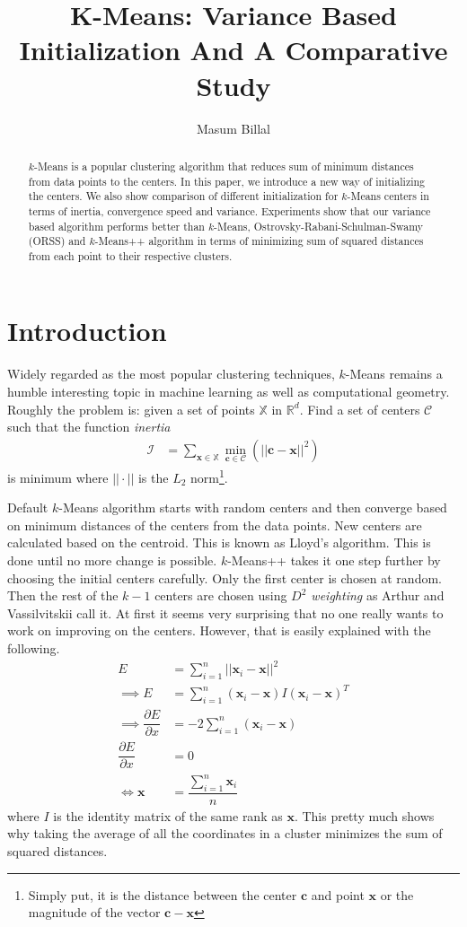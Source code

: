 \documentclass[10pt, leqno]{article}
\author{Masum Billal}
\title{K-Means: Variance Based Initialization And A Comparative Study}
\newcommand{\x}{\mathbf{x}}
\begin{document}
	\maketitle
		\begin{abstract}
			$k$-Means is a popular clustering algorithm that reduces sum of minimum distances from data points to the centers. In this paper, we introduce a new way of initializing the centers. We also show comparison of different initialization for $k$-Means centers in terms of inertia, convergence speed and variance. Experiments show that our variance based algorithm performs better than $k$-Means, Ostrovsky-Rabani-Schulman-Swamy (ORSS) and $k$-Means++ algorithm in terms of minimizing sum of squared distances from each point to their respective clusters.
		\end{abstract}
	\section{Introduction}
	Widely regarded as the most popular clustering techniques, $k$-Means remains a humble interesting topic in machine learning as well as computational geometry. Roughly the problem is: given a set of points $\mathbb{X}$ in $\mathbb{R}^d$. Find a set of centers $\mathcal{C}$ such that the function \textit{inertia}
		\begin{align*}
			\mathcal{I} & = \sum_{\mathbf{x}\in\mathbb{X}}\min_{\mathbf{c}\in\mathcal{C}}(||\mathbf{c}-\mathbf{x}||^2)
		\end{align*}
	is minimum where $||\cdot||$ is the $L_2$ norm\footnote{Simply put, it is the distance between the center $\mathbf{c}$ and point $\mathbf{x}$ or the magnitude of the vector $\mathbf{c}-\mathbf{x}$}.
	
	Default $k$-Means algorithm starts with random centers and then converge based on minimum distances of the centers from the data points. New centers are calculated based on the centroid. This is known as Lloyd's algorithm\cite{lloyd}. This is done until no more change is possible. $k$-Means++ takes it one step further by choosing the initial centers carefully. Only the first center is chosen at random. Then the rest of the $k-1$ centers are chosen using \textit{$D^2$ weighting} as Arthur and Vassilvitskii\cite{kmeans++} call it. At first it seems very surprising that no one really wants to work on improving on the centers. However, that is easily explained with the following.
		\begin{align*}
			E & = \sum_{i=1}^n||\x_i-\x||^2\\
			\implies E & = \sum_{i=1}^n(\x_i-\x)I(\x_i-\x)^{T}\\
			\implies \dfrac{\partial{E}}{\partial{x}} & = -2\sum_{i=1}^n(\x_i-\x)\\
			\dfrac{\partial{E}}{\partial{x}} & = 0\\
			\iff \x & = \dfrac{\sum_{i=1}^n\x_i}{n}
		\end{align*}
	where $I$ is the identity matrix of the same rank as $\x$. This pretty much shows why taking the average of all the coordinates in a cluster minimizes the sum of squared distances.
\end{document}
